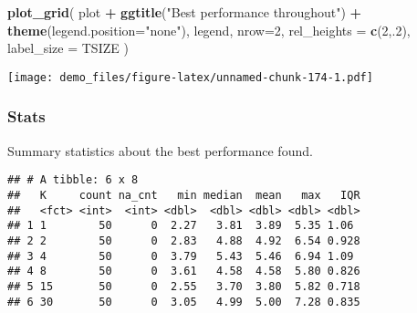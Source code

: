 \documentclass[]{book}
\newenvironment{Shaded}{\begin{snugshade}}{\end{snugshade}}
\newcommand{\DataTypeTok}[1]{\textcolor[rgb]{0.13,0.29,0.53}{#1}}
\newcommand{\DecValTok}[1]{\textcolor[rgb]{0.00,0.00,0.81}{#1}}
\newcommand{\KeywordTok}[1]{\textcolor[rgb]{0.13,0.29,0.53}{\textbf{#1}}}
\newcommand{\NormalTok}[1]{#1}
\newcommand{\OperatorTok}[1]{\textcolor[rgb]{0.81,0.36,0.00}{\textbf{#1}}}
\newcommand{\OtherTok}[1]{\textcolor[rgb]{0.56,0.35,0.01}{#1}}
\newcommand{\StringTok}[1]{\textcolor[rgb]{0.31,0.60,0.02}{#1}}
\begin{document}
\begin{Shaded}
\begin{Highlighting}[]
\KeywordTok{plot_grid}\NormalTok{(}
\NormalTok{  plot }\OperatorTok{+}
\StringTok{    }\KeywordTok{ggtitle}\NormalTok{(}\StringTok{"Best performance throughout"}\NormalTok{) }\OperatorTok{+}
\StringTok{    }\KeywordTok{theme}\NormalTok{(}\DataTypeTok{legend.position=}\StringTok{"none"}\NormalTok{),}
\NormalTok{  legend,}
  \DataTypeTok{nrow=}\DecValTok{2}\NormalTok{,}
  \DataTypeTok{rel_heights =} \KeywordTok{c}\NormalTok{(}\DecValTok{2}\NormalTok{,.}\DecValTok{2}\NormalTok{),}
  \DataTypeTok{label_size =}\NormalTok{ TSIZE}
\NormalTok{)}
\end{Highlighting}
\end{Shaded}

\texttt{[image: demo\_files/figure-latex/unnamed-chunk-174-1.pdf]}

\hypertarget{stats-78}{%
\subsubsection{Stats}\label{stats-78}}

Summary statistics about the best performance found.

\begin{Shaded}
\end{Shaded}

\begin{verbatim}
## # A tibble: 6 x 8
##   K     count na_cnt   min median  mean   max   IQR
##   <fct> <int>  <int> <dbl>  <dbl> <dbl> <dbl> <dbl>
## 1 1        50      0  2.27   3.81  3.89  5.35 1.06 
## 2 2        50      0  2.83   4.88  4.92  6.54 0.928
## 3 4        50      0  3.79   5.43  5.46  6.94 1.09 
## 4 8        50      0  3.61   4.58  4.58  5.80 0.826
## 5 15       50      0  2.55   3.70  3.80  5.82 0.718
## 6 30       50      0  3.05   4.99  5.00  7.28 0.835
\end{verbatim}
\end{document}
